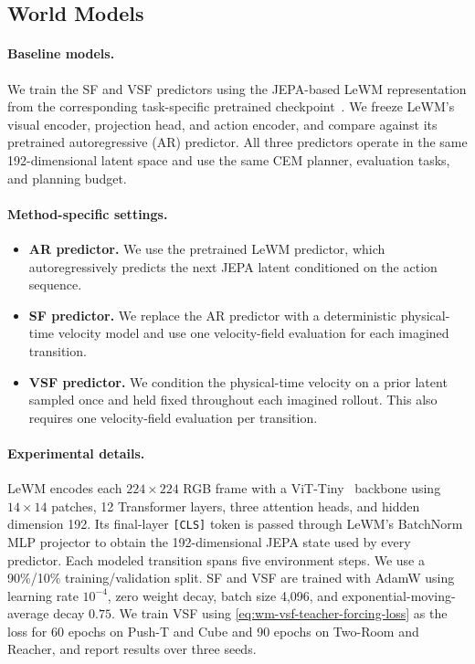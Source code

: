 \subsection{World Models}
\label{sec:world-model-setup}

\paragraph{Baseline models.}
We train the SF and VSF predictors using the JEPA-based LeWM representation
from the corresponding task-specific pretrained checkpoint~\citep{maes2026leworldmodel}.
We freeze LeWM's visual encoder, projection head, and action encoder, and compare
against its pretrained autoregressive (AR) predictor.  All
three predictors operate in the same 192-dimensional latent space and use the
same CEM planner, evaluation tasks, and planning budget.

\paragraph{Method-specific settings.}
\begin{itemize}
  \item \textbf{AR predictor.} We use the pretrained LeWM predictor, which
  autoregressively predicts the next JEPA latent conditioned on the action
  sequence.

  \item \textbf{SF predictor.} We replace the AR predictor with a deterministic
  physical-time velocity model and use one velocity-field evaluation for each
  imagined transition.

  \item \textbf{VSF predictor.} We condition the physical-time velocity on a
  prior latent sampled once and held fixed throughout each imagined rollout.
  This also requires one velocity-field evaluation per transition.
\end{itemize}

\paragraph{Experimental details.}

LeWM encodes each $224\times224$ RGB frame with a ViT-Tiny~\citep{dosovitskiy2020image} backbone using
$14\times14$ patches, 12 Transformer layers, three attention heads, and hidden
dimension 192. Its final-layer \texttt{[CLS]} token is passed through LeWM's
BatchNorm MLP projector to obtain the 192-dimensional JEPA
state used by every predictor. Each modeled transition spans five environment
steps. We use a 90\%/10\% training/validation split.  SF and VSF are
trained with AdamW using learning rate $10^{-4}$, zero weight decay, batch
size 4,096, and exponential-moving-average decay $0.75$.  We train VSF using \cref{eq:wm-vsf-teacher-forcing-loss} as the loss for 60
epochs on Push-T and Cube and 90 epochs on Two-Room and Reacher, and report
results over three seeds.


